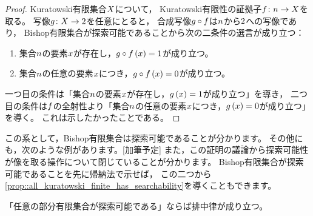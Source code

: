 \begin{proof}
    Kuratowski有限集合\(\Set\)について，
    Kuratowski有限性の証拠子\(\FunctionStyle{\Map}{\NaturalNumber}{\Set}\)を取る。
    写像\(\FunctionStyle{\Map<g>}{\Set}{\NaturalNumber<2>}\)を任意にとると，
    合成写像\(\Map<g>\circ\Map\)は\(\NaturalNumber\)から\(\NaturalNumber<2>\)への写像であり，
    Bishop有限集合が探索可能であることから次の二条件の選言が成り立つ：
    \begin{enumerate}
        \item 集合\(\NaturalNumber\)の要素\(\Element\)が存在し，\(\Map<g \circ f>(\Element)=\NaturalNumber<1>\)が成り立つ。
        \item 集合\(\NaturalNumber\)の任意の要素\(\Element\)につき，\(\Map<g \circ f>(\Element)=\NaturalNumber<0>\)が成り立つ。
    \end{enumerate}
    一つ目の条件は「集合\(\NaturalNumber\)の要素\(\Element\)が存在し，\(\Map<g>(\Element)=\NaturalNumber<1>\)が成り立つ」を導き，
    二つ目の条件は\(\Map\)の全射性より「集合\(\NaturalNumber\)の任意の要素\(\Element\)につき，\(\Map<g>(\Element)=\NaturalNumber<0>\)が成り立つ」を導く。
    これは示したかったことである。
\end{proof}

この系として，Bishop有限集合は探索可能であることが分かります。
その他にも，次のような例があります。{\color{red}[加筆予定]}
また，この証明の議論から探索可能性が像を取る操作について閉じていることが分かります。
Bishop有限集合が探索可能であることを先に帰納法で示せば，
この二つから\cref{prop::all_kuratowski_finite_has_searchability}を導くこともできます。

\begin{proposition}\label{prop::all_subfinite_has_not_searchability}
    「任意の部分有限集合が探索可能である」ならば排中律が成り立つ。
\end{proposition}

